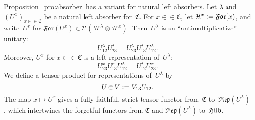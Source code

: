 \documentclass[a4paper]{amsart}
\numberwithin{equation}{section}
\theoremstyle{plain}
\numberwithin{theorem}{section}
\theoremstyle{definition}
\theoremstyle{remark}
\newcommand{\tenscorep}{\mathbin{\begin{tikzpicture}[baseline,x=.75ex,y=.75ex] \draw[line width=.2pt] (-0.8,1.15)--(0.8,1.15);\draw[line width=.2pt](0,-0.25)--(0,1.15); \draw[line width=.2pt] (0,0.75) circle [radius = 1];\end{tikzpicture}}}
\newcommand*{\inOb}{\mathrel{\in\in}}%
\newcommand*{\Cat}{\mathfrak C}     %
\newcommand*{\Hilb}{\mathfrak{Hilb}}%
\newcommand*{\Corepcat}[1]{\mathfrak{Rep}(#1)}%
\newcommand*{\Forget}{\mathfrak{For}}%
\newcommand*{\Hils}[1][H]{\mathcal{#1}}%
\newcommand*{\U}{\mathcal U}%
\newcommand*{\defeq}{\mathrel{\vcentcolon=}}
\begin{document}
Proposition~\ref{pro:absorber} has a variant for natural left
absorbers.  Let \(\lambda\)
and~\((U^x)_{x\inOb\Cat}\)
be a natural left absorber for~\(\Cat\).
For \(x\inOb\Cat\),
let \(\Hils^x \defeq \Forget(x)\),
and write~\(U^x\)
for \(\Forget(U^x)\in \U(\Hils^\lambda\otimes\Hils^x)\).
Then~\(U^\lambda\) is an ``antimultiplicative'' unitary:
\[
U^\lambda_{12}U^\lambda_{23}
= U^\lambda_{23}U^\lambda_{13}U^\lambda_{12}.
\]
Moreover, \(U^x\)
for \(x\inOb\Cat\) is a left representation of~\(U^\lambda\):
\[
U^{x}_{23}U^{x}_{13}U^\lambda_{12}
= U^\lambda_{12}U^x_{23}.
\]
We define a tensor product for representations of~\(U^\lambda\) by
\[
U \tenscorep V \defeq V_{13}U_{12}.
\]
The map \(x\mapsto U^x\)
gives a fully faithful, strict tensor functor from~\(\Cat\)
to~\(\Corepcat{U^\lambda}\),
which intertwines the forgetful functors from \(\Cat\)
and \(\Corepcat{U^\lambda}\) to~\(\Hilb\).
\end{document}
